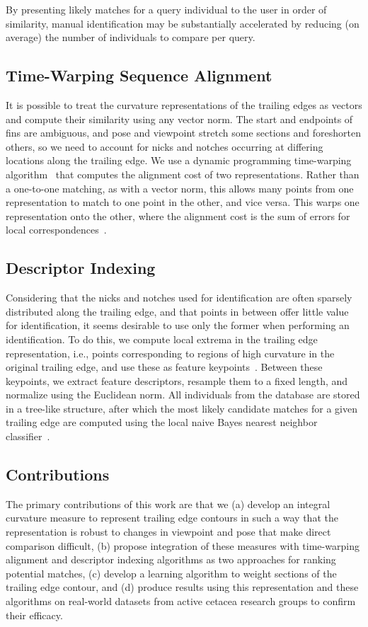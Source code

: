 \documentclass[10pt,twocolumn,letterpaper]{article}
\begin{document}
By presenting likely matches for a query individual to the user in order of
similarity, manual identification may be substantially accelerated by reducing
(on average) the number of individuals to compare per query.

\subsection{Time-Warping Sequence Alignment} 
It is possible to treat the curvature representations of the trailing edges as
vectors and compute their similarity using any vector norm.  The start and
endpoints of fins are ambiguous, and pose and viewpoint stretch some sections
and foreshorten others, so we need to account for nicks and notches occurring
at differing locations along the trailing edge.  We use a dynamic programming
time-warping algorithm~\cite{Sakoe78} that computes the alignment cost of two
representations.  Rather than a one-to-one matching, as with a vector norm,
this allows many points from one representation to match to one point in the
other, and vice versa.  This warps one representation onto the other, where the
alignment cost is the sum of errors for local correspondences~\cite{Jablons16}.

\subsection{Descriptor Indexing} 
Considering that the nicks and notches used for identification are often
sparsely distributed along the trailing edge, and that points in between offer
little value for identification, it seems desirable to use only the former when
performing an identification.  To do this, we compute local extrema in the
trailing edge representation, i.e., points corresponding to regions of high
curvature in the original trailing edge, and use these as feature
keypoints~\cite{Hughes16}.  Between these keypoints, we extract feature
descriptors, resample them to a fixed length, and normalize using the Euclidean
norm.  All individuals from the database are stored in a tree-like structure,
after which the most likely candidate matches for a given trailing edge are
computed using the local naive Bayes nearest neighbor classifier~\cite{McCann12}.

\subsection{Contributions}
The primary contributions of this work are that we (a) develop an integral
curvature measure to represent trailing edge contours in such a way that the
representation is robust to changes in viewpoint and pose that make direct
comparison difficult, (b) propose integration of these measures with
time-warping alignment and descriptor indexing algorithms as two approaches for
ranking potential matches, (c) develop a learning algorithm to weight sections
of the trailing edge contour, and (d) produce results using this representation
and these algorithms on real-world datasets from active cetacea research groups
to confirm their efficacy.
\end{document}

